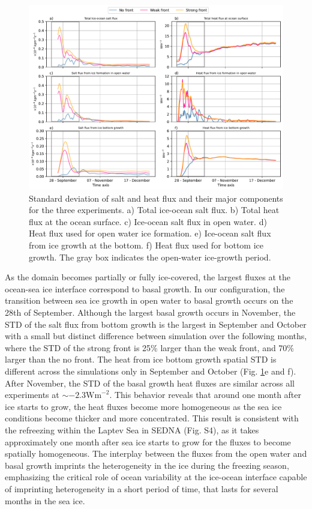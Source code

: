 \documentclass[draft]{agujournal2019}
\begin{document}
\begin{figure}
    \includegraphics[width=1\textwidth]{Fig_4_mean_salt_heat_flux_expts_front_ts_relevant_std.pdf}
    \caption{Standard deviation of salt and heat flux and their major components for the three experiments. a) Total ice-ocean salt flux. b) Total heat flux at the ocean surface. c) Ice-ocean salt flux in open water. d) Heat flux used for open water ice formation. e) Ice-ocean salt flux from ice growth at the bottom.  f) Heat flux used for bottom ice growth. The gray box indicates the open-water ice-growth period.} 
    \label{fig:fig4}
\end{figure}

As the domain becomes partially or fully ice-covered, the largest fluxes at the ocean-sea ice interface correspond to basal growth. In our configuration, the transition between sea ice growth in open water to basal growth occurs on the 28th of September. Although the largest basal growth occurs in November, the STD of the salt flux from bottom growth is the largest in September and October with a small but distinct difference between simulation over the following months, where the STD of the strong front is 25\% larger than the weak front, and 70\% larger than the no front. The heat from ice bottom growth spatial STD is different across the simulations only in September and October (Fig. \ref{fig:fig4}e and f). 
After November, the STD of the basal growth heat fluxes are similar across all experiments at $\sim - 2.3 \text{Wm}^{-2}$. This behavior reveals that around one month after ice starts to grow, the heat fluxes become more homogeneous as the sea ice conditions become thicker and more concentrated. 
This result is consistent with the refreezing within the Laptev Sea in SEDNA (Fig. S4), as it takes approximately one month after sea ice starts to grow for the fluxes to become spatially homogeneous. 
The interplay between the fluxes from the open water and basal growth imprints the heterogeneity in the ice during the freezing season, emphasizing the critical role of ocean variability at the ice-ocean interface capable of imprinting heterogeneity in a short period of time, that lasts for several months in the sea ice. 
\end{document}
